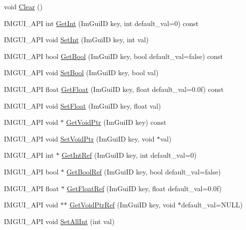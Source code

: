 \begin{DoxyCompactItemize}
\item 
void \hyperlink{struct_im_gui_storage_a72ceecfbca3d08df8c2a232b77890c20}{Clear} ()
\item 
I\+M\+G\+U\+I\+\_\+\+A\+PI int \hyperlink{struct_im_gui_storage_ac86b64f5c69a15de6c6c326963eca64a}{Get\+Int} (Im\+Gui\+ID key, int default\+\_\+val=0) const
\item 
I\+M\+G\+U\+I\+\_\+\+A\+PI void \hyperlink{struct_im_gui_storage_af83975ca841a9bd0e06a6ea0a41bf159}{Set\+Int} (Im\+Gui\+ID key, int val)
\item 
I\+M\+G\+U\+I\+\_\+\+A\+PI bool \hyperlink{struct_im_gui_storage_a22d34ae6278f86468a3e7df8fbd1b632}{Get\+Bool} (Im\+Gui\+ID key, bool default\+\_\+val=false) const
\item 
I\+M\+G\+U\+I\+\_\+\+A\+PI void \hyperlink{struct_im_gui_storage_ac5beee31a59b3f5294b41992717be7bf}{Set\+Bool} (Im\+Gui\+ID key, bool val)
\item 
I\+M\+G\+U\+I\+\_\+\+A\+PI float \hyperlink{struct_im_gui_storage_a0f51ef327f7e548d003b0e006967c1eb}{Get\+Float} (Im\+Gui\+ID key, float default\+\_\+val=0.\+0f) const
\item 
I\+M\+G\+U\+I\+\_\+\+A\+PI void \hyperlink{struct_im_gui_storage_ab531d90a0e5a1a2453e351c499149756}{Set\+Float} (Im\+Gui\+ID key, float val)
\item 
I\+M\+G\+U\+I\+\_\+\+A\+PI void $\ast$ \hyperlink{struct_im_gui_storage_aaf87a98ede89da09113b0189f6d878ca}{Get\+Void\+Ptr} (Im\+Gui\+ID key) const
\item 
I\+M\+G\+U\+I\+\_\+\+A\+PI void \hyperlink{struct_im_gui_storage_a55f840086b3ec9cf63c67f02d159204a}{Set\+Void\+Ptr} (Im\+Gui\+ID key, void $\ast$val)
\item 
I\+M\+G\+U\+I\+\_\+\+A\+PI int $\ast$ \hyperlink{struct_im_gui_storage_a28673fa7839263f3066ccb8e93e748a9}{Get\+Int\+Ref} (Im\+Gui\+ID key, int default\+\_\+val=0)
\item 
I\+M\+G\+U\+I\+\_\+\+A\+PI bool $\ast$ \hyperlink{struct_im_gui_storage_aeb0d62100453d710bac5f6ad0a6e6a2e}{Get\+Bool\+Ref} (Im\+Gui\+ID key, bool default\+\_\+val=false)
\item 
I\+M\+G\+U\+I\+\_\+\+A\+PI float $\ast$ \hyperlink{struct_im_gui_storage_a4b51cc8c92c65d4224af65a8ce7752ee}{Get\+Float\+Ref} (Im\+Gui\+ID key, float default\+\_\+val=0.\+0f)
\item 
I\+M\+G\+U\+I\+\_\+\+A\+PI void $\ast$$\ast$ \hyperlink{struct_im_gui_storage_a2b203317f3f488818e9b9f416fe35332}{Get\+Void\+Ptr\+Ref} (Im\+Gui\+ID key, void $\ast$default\+\_\+val=N\+U\+LL)
\item 
I\+M\+G\+U\+I\+\_\+\+A\+PI void \hyperlink{struct_im_gui_storage_ae5ee60618c4ce8e2b4ce0e5543d52992}{Set\+All\+Int} (int val)
\end{DoxyCompactItemize}
